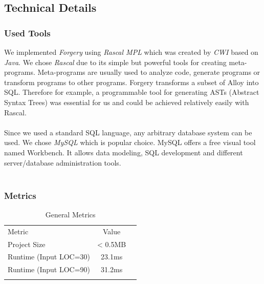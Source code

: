 \documentclass[oneside]{book}
\renewcommand\arraystretch{1.3}
\begin{document}
\newpage

\subsection{Technical Details}

\subsubsection{Used Tools}
We implemented \textit{Forgery} using \textit{Rascal MPL} which was created by \textit{CWI} based on \textit{Java}. We chose \textit{Rascal} due to its simple but powerful tools for creating meta-programs. Meta-programs are usually used to analyze code, generate programs or transform programs to other programs. Forgery transforms a subset of Alloy into SQL. Therefore for example, a programmable tool for generating ASTs (Abstract Syntax Trees) was essential for us and could be achieved relatively easily with Rascal.
\\\\
Since we used a standard SQL language, any arbitrary database system can be used. We chose \textit{MySQL} which is popular choice. MySQL offers a free visual tool named Workbench. It allows data modeling, SQL development and different server/database administration tools.
\\\\
\subsubsection{Metrics}
\def\arraystretch{1.5}%
\begin{table}[h!]
  \label{tab:table1}
  \begin{tabular}{|l||c|c|}
  \hhline{-|-|-|}
    Metric & Value\\
    \hhline{|=|=|=|}
    Project Size & < 0.5MB \\
    \hhline{-|-|-|}
    Runtime (Input LOC=30) & 23.1ms \\
    \hhline{-|-|-|}
    Runtime (Input LOC=90) & 31.2ms \\
    \hhline{-|-|-|}
  \end{tabular}
  \centering
  \caption{General Metrics}
\end{table}
\end{document}
